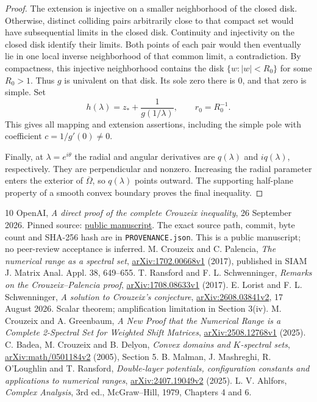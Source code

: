 \documentclass[11pt]{article}
\theoremstyle{remark}\newtheorem{remark}[theorem]{Remark}
\begin{document}
\begin{proof}
The extension is injective on a smaller neighborhood of the closed
disk. Otherwise, distinct colliding pairs arbitrarily close to that
compact set would have subsequential limits in the closed disk.
Continuity and injectivity on the closed disk identify their limits.
Both points of each pair would then eventually lie in one local
inverse neighborhood of that common limit, a contradiction. By compactness,
this injective neighborhood contains the disk $\{w:|w|<R_0\}$ for some $R_0>1$.
Thus $g$ is univalent on that disk. Its sole zero there
is $0$, and that zero is simple. Set
\[
 h(\lambda)=z_*+\frac1{g(1/\lambda)},\qquad r_0=R_0^{-1}.
\]
This gives all mapping and extension assertions, including the simple
pole with coefficient $c=1/g'(0)\ne0$.

Finally, at $\lambda=e^{i\theta}$ the radial and angular derivatives
are $q(\lambda)$ and $iq(\lambda)$, respectively. They are perpendicular
and nonzero. Increasing the radial parameter enters the exterior of
$\overline\Omega$, so $q(\lambda)$ points outward. The supporting
half-plane property of a smooth convex boundary proves the final
inequality.
\end{proof}
\begin{thebibliography}{10}
 OpenAI, \emph{A direct proof of the complete Crouzeix inequality}, 26 September 2026. Pinned source: \href{https://github.com/openai/math/blob/adc7f1241b42e322a6451854ab7e4b4c146bf78a/preprints/A-direct-proof-of-the-complete-Crouzeix-inequality-September-26-2026/paper.pdf}{public manuscript}. The exact source path, commit, byte count and SHA-256 hash are in \texttt{PROVENANCE.json}. This is a public manuscript; no peer-review acceptance is inferred.
 M. Crouzeix and C. Palencia, \emph{The numerical range as a spectral set}, \href{https://arxiv.org/abs/1702.00668v1}{arXiv:1702.00668v1} (2017), published in SIAM J. Matrix Anal. Appl. 38, 649--655.
 T. Ransford and F. L. Schwenninger, \emph{Remarks on the Crouzeix--Palencia proof}, \href{https://arxiv.org/abs/1708.08633v1}{arXiv:1708.08633v1} (2017).
 E. Lorist and F. L. Schwenninger, \emph{A solution to Crouzeix's conjecture}, \href{https://arxiv.org/abs/2608.03841v2}{arXiv:2608.03841v2}, 17 August 2026. Scalar theorem; amplification limitation in Section 3(iv).
 M. Crouzeix and A. Greenbaum, \emph{A New Proof that the Numerical Range is a Complete 2-Spectral Set for Weighted Shift Matrices}, \href{https://arxiv.org/abs/2508.12768v1}{arXiv:2508.12768v1} (2025).
 C. Badea, M. Crouzeix and B. Delyon, \emph{Convex domains and $K$-spectral sets}, \href{https://arxiv.org/abs/math/0501184v2}{arXiv:math/0501184v2} (2005), Section 5.
 B. Malman, J. Mashreghi, R. O'Loughlin and T. Ransford, \emph{Double-layer potentials, configuration constants and applications to numerical ranges}, \href{https://arxiv.org/abs/2407.19049v2}{arXiv:2407.19049v2} (2025).
 L. V. Ahlfors, \emph{Complex Analysis}, 3rd ed., McGraw--Hill, 1979, Chapters 4 and 6.
\end{thebibliography}
\end{document}

